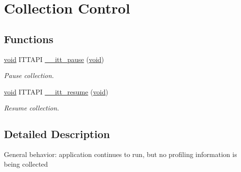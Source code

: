 \hypertarget{group__legacy__control}{\section{Collection Control}
\label{group__legacy__control}
}
\subsection*{Functions}
\begin{DoxyCompactItemize}
\item 
\hyperlink{ittnotify__static_8h_af941d56e55e3c5465135b60c4d6343ed}{void} I\-T\-T\-A\-P\-I \hyperlink{group__legacy__control_gad78ccc44054839ddacb2f9c6a1db05f0}{\-\_\-\-\_\-itt\-\_\-pause} (\hyperlink{ittnotify__static_8h_af941d56e55e3c5465135b60c4d6343ed}{void})
\begin{DoxyCompactList}\small\item\em Pause collection. \end{DoxyCompactList}\item 
\hyperlink{ittnotify__static_8h_af941d56e55e3c5465135b60c4d6343ed}{void} I\-T\-T\-A\-P\-I \hyperlink{group__legacy__control_ga49d9a951d74ef2fe9f93d2a60adfe0e9}{\-\_\-\-\_\-itt\-\_\-resume} (\hyperlink{ittnotify__static_8h_af941d56e55e3c5465135b60c4d6343ed}{void})
\begin{DoxyCompactList}\small\item\em Resume collection. \end{DoxyCompactList}\end{DoxyCompactItemize}


\subsection{Detailed Description}
General behavior\-: application continues to run, but no profiling information is being collected

